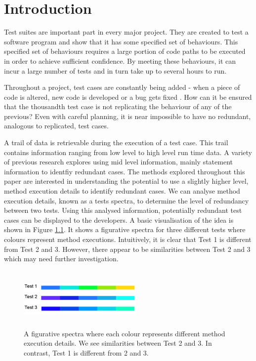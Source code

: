 \chapter{Introduction}\label{C:intro}

Test suites are important part in every major project. They are created to test a software program and show that it has some specified set of behaviours. This specified set of behaviours requires a large portion of code paths to be executed in order to achieve sufficient confidence. By meeting these behaviours, it can incur a large number of tests and in turn take up to several hours to run. 

Throughout a project, test cases are constantly being added - when a piece of code is altered, new code is developed or a bug gets fixed \cite{issuetrack,whentotest}. How can it be ensured that the thousandth test case is not replicating the behaviour of any of the previous? Even with careful planning, it is near impossible to have no redundant, analogous to replicated, test cases. 

A trail of data is retrievable during the execution of a test case. This trail contains information ranging from low level to high level run time data. A variety of previous research \cite{wong1995effect, wong1999test, rothermel1998empirical, rothermel2002empirical,koochakzadeh2009test,zhang2011empirical,li2008static} explores using mid level information, mainly statement information to identfiy redundant cases. The methods explored throughout this paper are interested in understanding the potential to use a slightly higher level, method execution details to identify redundant cases. We can analyse method execution details, known as a tests spectra, to determine the level of redundancy between two tests. Using this analysed information, potentially redundant test cases can be displayed to the developers. A basic visualisation of the idea is shown in Figure \ref{fig:spectra}. It shows a figurative spectra for three different tests where colours represent method executions. Intuitively, it is clear that Test 1 is different from Test 2 and 3. However, there appear to be similarities between Test 2 and 3 which may need further investigation. 

\begin{figure}[h]
\centering
\includegraphics[width=6cm,height=3cm]{spectra.png}
\caption{A figurative spectra where each colour represents different method execution details. We see similarities between Test 2 and 3. In contrast, Test 1 is different from 2 and 3. }
\label{fig:spectra}
\end{figure}


